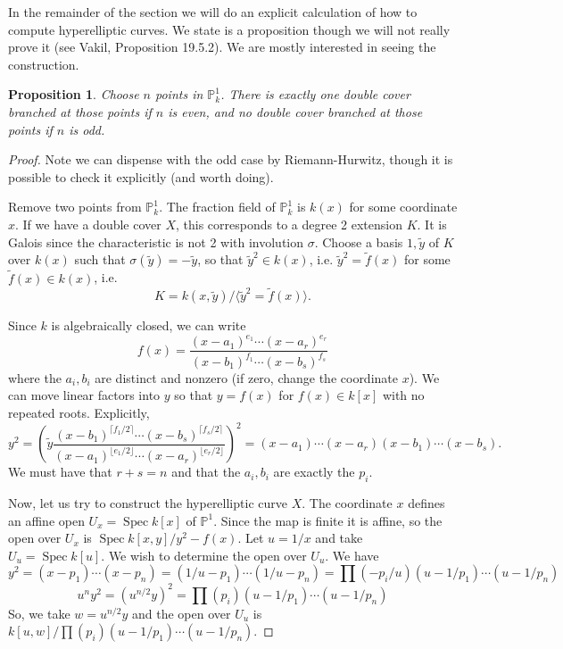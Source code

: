 \documentclass[10pt]{article}
\newtheorem{prop}[thm]{Proposition}
\theoremstyle{definition}
\DeclareMathOperator{\Spec}{Spec}
\newcommand{\PP}{\mathbb{P}}
\begin{document}
In the remainder of the section we will do an explicit calculation of how to compute hyperelliptic curves.  We state is a proposition though we will not really prove it (see Vakil, Proposition 19.5.2).  We are mostly interested in seeing the construction.
\begin{prop}
Choose $n$ points in $\PP^1_k$.  There is exactly one double cover branched at those points if $n$ is even, and no double cover branched at those points if $n$ is odd.
\end{prop}
\begin{proof}
Note we can dispense with the odd case by Riemann-Hurwitz, though it is possible to check it explicitly (and worth doing).

Remove two points from $\PP^1_k$.  The fraction field of $\PP^1_k$ is $k(x)$ for some coordinate $x$.  If we have a double cover $X$, this corresponds to a degree 2 extension $K$.  It is Galois since the characteristic is not 2 with involution $\sigma$.  Choose a basis $1, \tilde{y}$ of $K$ over $k(x)$ such that $\sigma(\tilde{y}) = -\tilde{y}$, so that $\tilde{y}^2 \in k(x)$, i.e. $\tilde{y}^2 = \tilde{f}(x)$ for some $\tilde{f}(x) \in k(x)$, i.e. 
$$K = k(x, \tilde{y})/\langle \tilde{y}^2 = \tilde{f}(x) \rangle.$$

Since $k$ is algebraically closed, we can write
$$f(x) = \frac{(x - a_1)^{e_1} \cdots (x-a_r)^{e_r}}{(x-b_1)^{f_1} \cdots (x-b_s)^{f_s}}$$
where the $a_i, b_i$ are distinct and nonzero (if zero, change the coordinate $x$).  We can move linear factors into $y$ so that $y = f(x)$ for $f(x) \in k[x]$ with no repeated roots.  Explicitly, $$y^2 = \left( \tilde{y} \frac{(x-b_1)^{\lceil f_1/2 \rceil} \cdots (x-b_s)^{\lceil f_s/2 \rceil}}{(x - a_1)^{\lfloor e_1/2 \rfloor} \cdots (x-a_r)^{\lfloor e_r/2 \rfloor}} \right)^2 = (x-a_1)\cdots (x-a_r) (x-b_1) \cdots (x-b_s).$$
We must have that $r+s =n$ and that the $a_i, b_i$ are exactly the $p_i$.

Now, let us try to construct the hyperelliptic curve $X$.  The coordinate $x$ defines an affine open $U_x = \Spec k[x]$ of $\PP^1$.  Since the map is finite it is affine, so the open over $U_x$ is $\Spec k[x, y]/y^2 - f(x)$.  Let $u = 1/x$ and take $U_u = \Spec k[u]$.  We wish to determine the open over $U_u$.  We have
$$y^2 = (x-p_1)\cdots(x-p_n) = (1/u - p_1)\cdots(1/u-p_n) = \prod(-p_i/u) (u - 1/p_1)\cdots(u-1/p_n)$$
$$u^n y^2 = (u^{n/2}y)^2 =  \prod(p_i) (u - 1/p_1)\cdots(u-1/p_n)$$
So, we take $w = u^{n/2}y$ and the open over $U_u$ is $k[u, w]/\prod(p_i) (u - 1/p_1)\cdots(u-1/p_n)$.




\end{proof}
\end{document}
